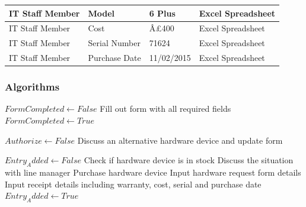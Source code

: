 \begin{table}[H]
{\begin{tabular}{|p{4cm}|p{5.3cm}|p{8cm}|p{3cm}|}
IT Staff Member                             & Model                              & 6 Plus                                             & Excel Spreadsheet                                       \\ \hline
IT Staff Member                       & Cost                              & Â£400                                               & Excel Spreadsheet        \\ \hline
IT Staff Member                       & Serial Number                      & 71624                                          &  Excel Spreadsheet           \\ \hline
IT Staff Member                       & Purchase Date                      & 11/02/2015                                         &  Excel Spreadsheet           \\ \hline
\end{tabular}
}
\end{table}

\subsubsection{Algorithms}

\begin{algorithm}[H]
\begin{algorithmic}
\State $FormCompleted  \leftarrow False$
	\State Fill out form with all required fields
	\State $FormCompleted \leftarrow True$
\Else
\EndIf
\end{algorithmic}
\end{algorithm}

\begin{algorithm}[H]
\begin{algorithmic}
\State$Authorize \leftarrow False$
		\State Discuss an alternative hardware device and update form
	\Else
	\EndIf
\EndWhile
\end{algorithmic}
\end{algorithm}


\begin{algorithm}[H]
\begin{algorithmic}
\State $Entry_Added \leftarrow False$
	\State Check if hardware device is in stock
		\State Discuss the situation with line manager
	\Else
		\State Purchase hardware device
		\State Input hardware request form details
		\State Input receipt details including warranty, cost, serial and purchase date
		\State $Entry_Added \leftarrow True$
	\EndIf
\EndWhile
\end{algorithmic}
\end{algorithm}
		

